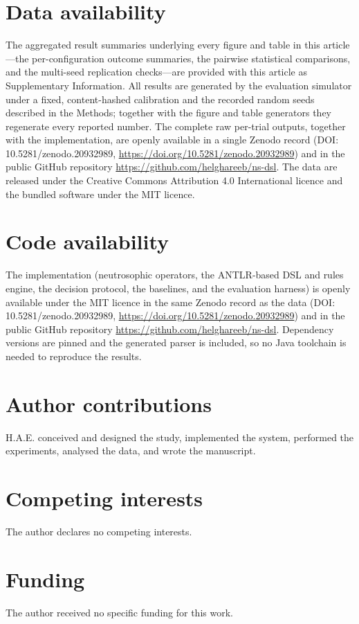 \documentclass[fleqn,10pt]{wlscirep}
\begin{document}
\section*{Data availability}
The aggregated result summaries underlying every figure and table in this article---the
per-configuration outcome summaries, the pairwise statistical comparisons, and the multi-seed
replication checks---are provided with this article as Supplementary Information. All results are
generated by the evaluation simulator under a fixed, content-hashed calibration and the recorded
random seeds described in the Methods; together with the figure and table generators they regenerate
every reported number. The complete raw per-trial outputs, together with the implementation, are
openly available in a single Zenodo record (DOI: 10.5281/zenodo.20932989,
\url{https://doi.org/10.5281/zenodo.20932989}) and in the public GitHub repository
\url{https://github.com/helghareeb/ns-dsl}. The data are released under the Creative Commons
Attribution 4.0 International licence and the bundled software under the MIT licence.

\section*{Code availability}
The implementation (neutrosophic operators, the ANTLR-based DSL and rules engine, the decision
protocol, the baselines, and the evaluation harness) is openly available under the MIT licence in the
same Zenodo record as the data (DOI: 10.5281/zenodo.20932989,
\url{https://doi.org/10.5281/zenodo.20932989}) and in the public GitHub repository
\url{https://github.com/helghareeb/ns-dsl}. Dependency versions are pinned and the generated parser
is included, so no Java toolchain is needed to reproduce the results.

\section*{Author contributions}
H.A.E. conceived and designed the study, implemented the system, performed the experiments, analysed the
data, and wrote the manuscript.

\section*{Competing interests}
The author declares no competing interests.

\section*{Funding}
The author received no specific funding for this work.
\end{document}
